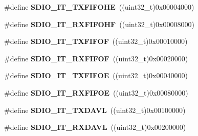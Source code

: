 \begin{DoxyCompactItemize}
\item 
\hypertarget{group___s_d_i_o___interrupt__sources_gaf538ae7dd73d55e76069e8710858038a}{\#define {\bfseries S\-D\-I\-O\-\_\-\-I\-T\-\_\-\-T\-X\-F\-I\-F\-O\-H\-E}~((uint32\-\_\-t)0x00004000)}\label{group___s_d_i_o___interrupt__sources_gaf538ae7dd73d55e76069e8710858038a}

\item 
\hypertarget{group___s_d_i_o___interrupt__sources_gadcbc1a0de8b9df83b5c6c839b4739c87}{\#define {\bfseries S\-D\-I\-O\-\_\-\-I\-T\-\_\-\-R\-X\-F\-I\-F\-O\-H\-F}~((uint32\-\_\-t)0x00008000)}\label{group___s_d_i_o___interrupt__sources_gadcbc1a0de8b9df83b5c6c839b4739c87}

\item 
\hypertarget{group___s_d_i_o___interrupt__sources_ga3ec471bd9233561d6e929ebac6362b75}{\#define {\bfseries S\-D\-I\-O\-\_\-\-I\-T\-\_\-\-T\-X\-F\-I\-F\-O\-F}~((uint32\-\_\-t)0x00010000)}\label{group___s_d_i_o___interrupt__sources_ga3ec471bd9233561d6e929ebac6362b75}

\item 
\hypertarget{group___s_d_i_o___interrupt__sources_gae60a1d8e5a7caff85d84e513b093b8a8}{\#define {\bfseries S\-D\-I\-O\-\_\-\-I\-T\-\_\-\-R\-X\-F\-I\-F\-O\-F}~((uint32\-\_\-t)0x00020000)}\label{group___s_d_i_o___interrupt__sources_gae60a1d8e5a7caff85d84e513b093b8a8}

\item 
\hypertarget{group___s_d_i_o___interrupt__sources_gabff1466c2f2effbe30b80a11c132d7c0}{\#define {\bfseries S\-D\-I\-O\-\_\-\-I\-T\-\_\-\-T\-X\-F\-I\-F\-O\-E}~((uint32\-\_\-t)0x00040000)}\label{group___s_d_i_o___interrupt__sources_gabff1466c2f2effbe30b80a11c132d7c0}

\item 
\hypertarget{group___s_d_i_o___interrupt__sources_ga80b01aaf64c873d21bfa95e5d98d8766}{\#define {\bfseries S\-D\-I\-O\-\_\-\-I\-T\-\_\-\-R\-X\-F\-I\-F\-O\-E}~((uint32\-\_\-t)0x00080000)}\label{group___s_d_i_o___interrupt__sources_ga80b01aaf64c873d21bfa95e5d98d8766}

\item 
\hypertarget{group___s_d_i_o___interrupt__sources_gac8e5744e6d977182a6fc7484a6f1195e}{\#define {\bfseries S\-D\-I\-O\-\_\-\-I\-T\-\_\-\-T\-X\-D\-A\-V\-L}~((uint32\-\_\-t)0x00100000)}\label{group___s_d_i_o___interrupt__sources_gac8e5744e6d977182a6fc7484a6f1195e}

\item 
\hypertarget{group___s_d_i_o___interrupt__sources_gaf236079642db95772334d1e9b9b27570}{\#define {\bfseries S\-D\-I\-O\-\_\-\-I\-T\-\_\-\-R\-X\-D\-A\-V\-L}~((uint32\-\_\-t)0x00200000)}\label{group___s_d_i_o___interrupt__sources_gaf236079642db95772334d1e9b9b27570}


\end{DoxyCompactItemize}
